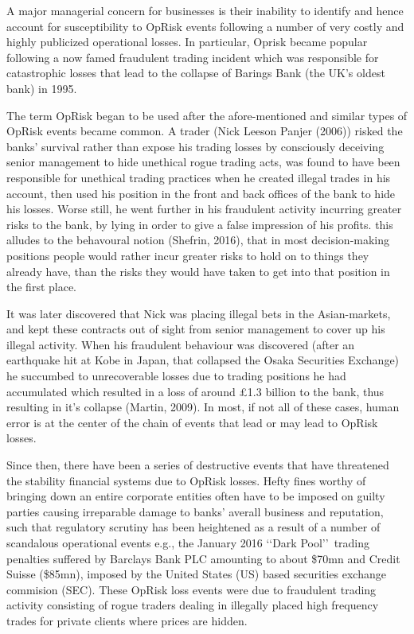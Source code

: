 \documentclass{DissertateUSU}
\begin{document}
A major managerial concern for businesses is their inability to identify
and hence account for susceptibility to OpRisk events following a number
of very costly and highly publicized operational losses. In particular,
Oprisk became popular following a now famed fraudulent trading incident
which was responsible for catastrophic losses that lead to the collapse
of Barings Bank (the UK's oldest bank) in 1995.\medskip

The term OpRisk began to be used after the afore-mentioned and similar
types of OpRisk events became common. A trader (Nick Leeson Panjer
(2006)) risked the banks' survival rather than expose his trading losses
by consciously deceiving senior management to hide unethical rogue
trading acts, was found to have been responsible for unethical trading
practices when he created illegal trades in his account, then used his
position in the front and back offices of the bank to hide his losses.
Worse still, he went further in his fraudulent activity incurring
greater risks to the bank, by lying in order to give a false impression
of his profits. this alludes to the behavoural notion (Shefrin, 2016),
that in most decision-making positions people would rather incur greater
risks to hold on to things they already have, than the risks they would
have taken to get into that position in the first place.\medskip

It was later discovered that Nick was placing illegal bets in the
Asian-markets, and kept these contracts out of sight from senior
management to cover up his illegal activity. When his fraudulent
behaviour was discovered (after an earthquake hit at Kobe in Japan, that
collapsed the Osaka Securities Exchange) he succumbed to unrecoverable
losses due to trading positions he had accumulated which resulted in a
loss of around \pounds 1.3 billion to the bank, thus resulting in it's
collapse (Martin, 2009). In most, if not all of these cases, human error
is at the center of the chain of events that lead or may lead to OpRisk
losses.\medskip\medskip

Since then, there have been a series of destructive events that have
threatened the stability financial systems due to OpRisk losses. Hefty
fines worthy of bringing down an entire corporate entities often have to
be imposed on guilty parties causing irreparable damage to banks'
averall business and reputation, such that regulatory scrutiny has been
heightened as a result of a number of scandalous operational events
e.g., the January 2016 \lq\lq Dark Pool\rq\rq~trading penalties suffered
by Barclays Bank PLC amounting to about \$70mn and Credit Suisse
(\$85mn), imposed by the United States (US) based securities exchange
commision (SEC). These OpRisk loss events were due to fraudulent trading
activity consisting of rogue traders dealing in illegally placed high
frequency trades for private clients where prices are hidden.\medskip
\end{document}

